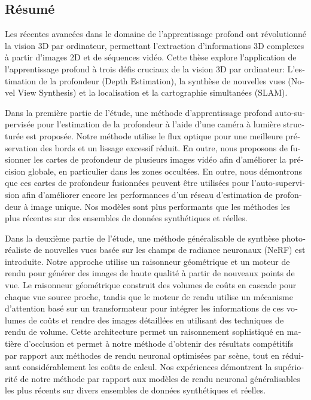 \begin{otherlanguage}{french}
\cleardoublepage
\chapter*{Résumé}
Les récentes avancées dans le domaine de l'apprentissage profond ont révolutionné la vision 3D par ordinateur, permettant l'extraction d'informations 3D complexes à partir d'images 2D et de séquences vidéo. Cette thèse explore l'application de l'apprentissage profond à trois défis cruciaux de la vision 3D par ordinateur: L'estimation de la profondeur (Depth Estimation), la synthèse de nouvelles vues (Novel View Synthesis) et la localisation et la cartographie simultanées (SLAM).

\vspace{2ex}
Dans la première partie de l'étude, une méthode d'apprentissage profond auto-supervisée pour l'estimation de la profondeur à l'aide d'une caméra à lumière structurée est proposée. Notre méthode utilise le flux optique pour une meilleure préservation des bords et un lissage excessif réduit. En outre, nous proposons de fusionner les cartes de profondeur de plusieurs images vidéo afin d'améliorer la précision globale, en particulier dans les zones occultées. En outre, nous démontrons que ces cartes de profondeur fusionnées peuvent être utilisées pour l'auto-supervision afin d'améliorer encore les performances d'un réseau d'estimation de profondeur à image unique. Nos modèles sont plus performants que les méthodes les plus récentes sur des ensembles de données synthétiques et réelles.


\vspace{2ex}
Dans la deuxième partie de l'étude, une méthode généralisable de synthèse photoréaliste de nouvelles vues basée sur les champs de radiance neuronaux (NeRF) est introduite. Notre approche utilise un raisonneur géométrique et un moteur de rendu pour générer des images de haute qualité à partir de nouveaux points de vue. Le raisonneur géométrique construit des volumes de coûts en cascade pour chaque vue source proche, tandis que le moteur de rendu utilise un mécanisme d'attention basé sur un transformateur pour intégrer les informations de ces volumes de coûts et rendre des images détaillées en utilisant des techniques de rendu de volume. Cette architecture permet un raisonnement sophistiqué en matière d'occlusion et permet à notre méthode d'obtenir des résultats compétitifs par rapport aux méthodes de rendu neuronal optimisées par scène, tout en réduisant considérablement les coûts de calcul. Nos expériences démontrent la supériorité de notre méthode par rapport aux modèles de rendu neuronal généralisables les plus récents sur divers ensembles de données synthétiques et réelles.


\end{otherlanguage}
